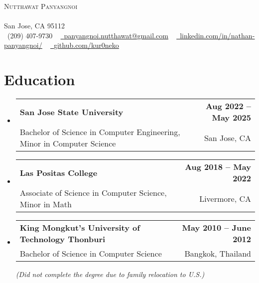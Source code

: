 \documentclass[letterpaper,11pt]{article}
\makeatletter
\newcommand{\resumeSubheading}[4]{
  \vspace{-2pt}\item
    \begin{tabular*}{1.0\textwidth}[t]{l@{\extracolsep{\fill}}r}
      \textbf{#1} & \textbf{\small #2} \\
      {\small#3} & {\small #4} \\
    \end{tabular*}\vspace{-7pt}
}
\newcommand{\resumeSubHeadingListStart}{\begin{itemize}[leftmargin=0.0in, label={}]}
\newcommand{\resumeSubHeadingListEnd}{\end{itemize}}
\makeatother
\begin{document}
\vspace{-10pt}
\begin{center}
    {\Huge \scshape Nutthawat Panyangnoi}\\ 
    \vspace{1pt}{https://kur0neko.com}\\ \vspace{1pt} 
    \vspace{0.5pt} San Jose, CA 95112 \\ \vspace{0.5pt}
    \small \raisebox{-0.1\height}\faPhone\ (209) 407-9730 ~ \href{mailto:panyangnoi.nutthawat@gmail.com}{\raisebox{-0.2\height}\faEnvelope\  \underline{panyangnoi.nutthawat@gmail.com}} ~ 
    \href{https://www.linkedin.com/in/nathan-panyangnoi/}{\raisebox{-0.2\height}\faLinkedin\ \underline{linkedin.com/in/nathan-panyangnoi/}}  ~
    \href{https://github.com/kur0neko}{\raisebox{-0.2\height}\faGithub\ \underline{github.com/kur0neko}}
    \vspace{-8pt}
\end{center}


\section{Education}
  \resumeSubHeadingListStart
    \resumeSubheading
      {San Jose State University}{Aug 2022 -- May 2025}
      {Bachelor of Science in Computer Engineering, Minor in Computer Science}{San Jose, CA}
      \resumeSubheading
      {Las Positas College}{Aug 2018 -- May 2022}
      {Associate of Science in Computer Science, Minor in Math}{Livermore, CA}
      \resumeSubheading
      {King Mongkut’s University of Technology Thonburi}{May 2010 -- June 2012}
      {Bachelor of Science in Computer Science} {Bangkok, Thailand}
      \newline
      \textit{(Did not complete the degree due to family relocation to U.S.) }
  \resumeSubHeadingListEnd

\end{document}

